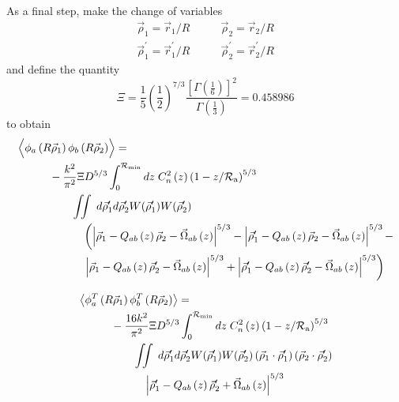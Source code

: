 As a final step, make the change of variables
\begin{equation}
\begin{aligned}
\vec{\rho}_{1} = \vec{r}_{1}/R \quad & \quad \vec{\rho}_{2} = \vec{r}_{2}/R \\
\vec{\rho}^{\prime}_{1} = \vec{r}^{\prime}_{1}/R \quad & \quad \vec{\rho}^{\prime}_{2} = \vec{r}^{\prime}_{2}/R
\end{aligned}
\end{equation}
and define the quantity 
\begin{equation}\label{Xi}
\Xi = \frac{1}{5}\left(\frac{1}{2}\right)^{7/3} \frac{\left[\Gamma\left(\frac{1}{6}\right)\right]^{2}}{\Gamma\left(\frac{1}{3}\right)} = 0.458986
\end{equation}
to obtain
\begin{equation}\label{prphase_n7}
\begin{aligned}
&\left\langle \vphantom{\hat{\phi}_{a}} \phi_{a}\left(R\vec{\rho}_{1}\right) \phi_{b}\left(R\vec{\rho}_{2}\right)\right\rangle = \\ 
&\quad\quad\quad
 -\frac{k^{2}}{\pi^{2}} \Xi D^{5/3}
\int_{0}^{\mathcal{R}_{\rm min}} dz\;C_{n}^{2}\left(z\right) \left(1 - z/\mathcal{R}_{\rm a}\right)^{5/3}\\
& \quad\quad\quad\quad\quad
\iint \; d\vec{\rho}^{\prime}_{1}d\vec{\rho}^{\prime}_{2}  
W(\vec{\rho}^{\prime}_{1}) W(\vec{\rho}^{\prime}_{2}) \\
& \quad\quad\quad\quad\quad\quad
\left(\left\vert \vec{\rho}_{1}  - Q_{ab}\left(z\right)\vec{\rho}_{2} - \vec{\Omega}_{ab}\left(z\right)\right\vert^{5/3} -
\left\vert \vec{\rho}^{\prime}_{1}  - Q_{ab}\left(z\right)\vec{\rho}_{2} - \vec{\Omega}_{ab}\left(z\right)\right\vert^{5/3} -
\right. \\
& \quad\quad\quad\quad\quad\quad
\left.
\left\vert \vec{\rho}_{1}  - Q_{ab}\left(z\right)\vec{\rho}^{\prime}_{2} - \vec{\Omega}_{ab}\left(z\right)\right\vert^{5/3} + 
\left\vert \vec{\rho}^{\prime}_{1}  - Q_{ab}\left(z\right)\vec{\rho}^{\prime}_{2} - \vec{\Omega}_{ab}\left(z\right)\right\vert^{5/3}\right)
\end{aligned}
\end{equation}

\begin{equation}\label{tphase_n7}
\begin{aligned}
&\left\langle \phi^{T}_{a}\left(R\vec{\rho}_{1}\right) \phi^{T}_{b}\left(R\vec{\rho}_{2}\right)\right\rangle = \\
&\quad\quad\quad
-\frac{16k^{2}}{\pi^{2}} 
\Xi D^{5/3}
\int_{0}^{\mathcal{R}_{\rm min}} dz\;C_{n}^{2}\left(z\right) \left(1 - z/\mathcal{R}_{\rm a}\right)^{5/3}\\
& \quad\quad\quad\quad\quad
\iint \; d\vec{\rho}^{\prime}_{1}d\vec{\rho}^{\prime}_{2} W(\vec{\rho}^{\prime}_{1}) W(\vec{\rho}^{\prime}_{2})
\left(\vec{\rho}_{1} \cdot \vec{\rho}^{\prime}_{1}\right)
\left(\vec{\rho}_{2} \cdot \vec{\rho}^{\prime}_{2}\right)
\\
&\quad\quad\quad\quad\quad\quad
\left\vert \vec{\rho}^{\prime}_{1} - Q_{ab}\left(z\right) \vec{\rho}^{\prime}_{2} + \vec{\Omega}_{ab}\left(z\right)\right\vert^{5/3}
\end{aligned}
\end{equation}

